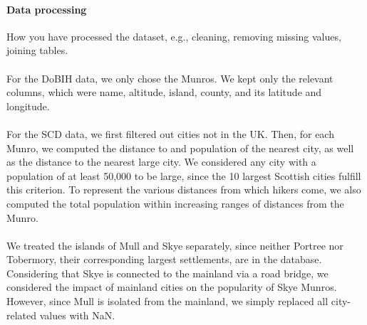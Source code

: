 \documentclass[11pt,a4paper]{article}
\begin{document}
\paragraph{Data processing} How you have processed the dataset, e.g.,
cleaning, removing missing values, joining tables.\\ \\
For the DoBIH data, we only chose the Munros. We kept only the relevant columns, which were name, altitude, island, county, and its latitude and longitude. \\ \\
For the SCD data, we first filtered out cities not in the UK. Then, for each Munro, we computed the distance to and population of the nearest city, as well as the distance to the nearest large city. We considered any city with a population of at least 50,000 to be large, since the 10 largest Scottish cities fulfill this criterion. To represent the various distances from which hikers come, we also computed the total population within increasing ranges of distances from the Munro.\\ \\
We treated the islands of Mull and Skye separately, since neither Portree nor Tobermory, their corresponding largest settlements, are in the database. Considering that Skye is connected to the mainland via a road bridge, we considered the impact of mainland cities on the popularity of Skye Munros. However, since Mull is isolated from the mainland, we simply replaced all city-related values with NaN. \\ \\
\end{document}
